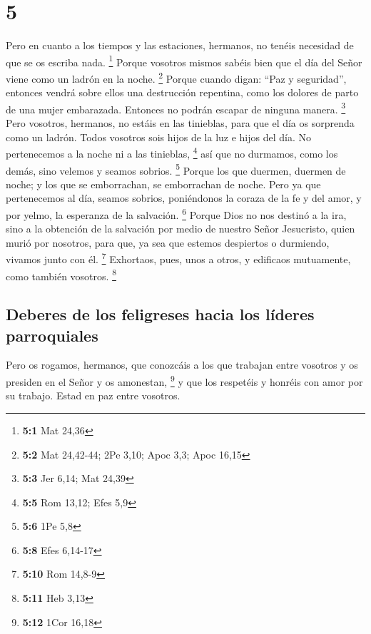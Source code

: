 \hypertarget{section-4}{%
\section{5}\label{section-4}}

 Pero en cuanto a los tiempos y las estaciones, hermanos,
no tenéis necesidad de que se os escriba nada. \footnote{\textbf{5:1}
  Mat 24,36}  Porque vosotros mismos sabéis bien que el
día del Señor viene como un ladrón en la noche. \footnote{\textbf{5:2}
  Mat 24,42-44; 2Pe 3,10; Apoc 3,3; Apoc 16,15}  Porque
cuando digan: ``Paz y seguridad'', entonces vendrá sobre ellos una
destrucción repentina, como los dolores de parto de una mujer
embarazada. Entonces no podrán escapar de ninguna manera. \footnote{\textbf{5:3}
  Jer 6,14; Mat 24,39}  Pero vosotros, hermanos, no estáis
en las tinieblas, para que el día os sorprenda como un ladrón.
 Todos vosotros sois hijos de la luz e hijos del día. No
pertenecemos a la noche ni a las tinieblas, \footnote{\textbf{5:5} Rom
  13,12; Efes 5,9}  así que no durmamos, como los demás,
sino velemos y seamos sobrios. \footnote{\textbf{5:6} 1Pe 5,8}
 Porque los que duermen, duermen de noche; y los que se
emborrachan, se emborrachan de noche.  Pero ya que
pertenecemos al día, seamos sobrios, poniéndonos la coraza de la fe y
del amor, y por yelmo, la esperanza de la salvación. \footnote{\textbf{5:8}
  Efes 6,14-17}  Porque Dios no nos destinó a la ira, sino
a la obtención de la salvación por medio de nuestro Señor Jesucristo,
 quien murió por nosotros, para que, ya sea que estemos
despiertos o durmiendo, vivamos junto con él. \footnote{\textbf{5:10}
  Rom 14,8-9}  Exhortaos, pues, unos a otros, y edificaos
mutuamente, como también vosotros. \footnote{\textbf{5:11} Heb 3,13}

\hypertarget{deberes-de-los-feligreses-hacia-los-luxedderes-parroquiales}{%
\subsection{Deberes de los feligreses hacia los líderes
parroquiales}\label{deberes-de-los-feligreses-hacia-los-luxedderes-parroquiales}}

 Pero os rogamos, hermanos, que conozcáis a los que
trabajan entre vosotros y os presiden en el Señor y os amonestan,
\footnote{\textbf{5:12} 1Cor 16,18}  y que los respetéis
y honréis con amor por su trabajo. Estad en paz entre vosotros.

